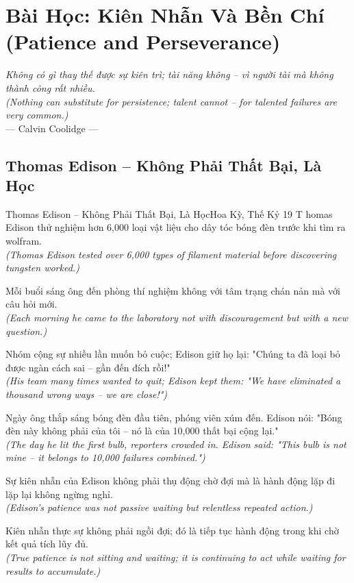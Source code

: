 \chapter{Bài Học: Kiên Nhẫn Và Bền Chí (Patience and Perseverance)}
\begin{center}
  \textit{\color{truyenblue}Không có gì thay thế được sự kiên trì; tài năng không -- vì người tài mà không thành công rất nhiều.}\\
  \textit{(Nothing can substitute for persistence; talent cannot -- for talented failures are very common.)}\\[4pt]
  \small\color{truyengold}--- Calvin Coolidge ---
\end{center}
\ngancach

\section{Thomas Edison -- Không Phải Thất Bại, Là Học}
\begin{truyen}{Thomas Edison -- Không Phải Thất Bại, Là Học}{Hoa Kỳ, Thế Kỷ 19}
T homas Edison thử nghiệm hơn 6,000 loại vật liệu cho dây tóc bóng đèn trước khi tìm ra wolfram.\\
\textit{(Thomas Edison tested over 6,000 types of filament material before discovering tungsten worked.)}

Mỗi buổi sáng ông đến phòng thí nghiệm không với tâm trạng chán nản mà với câu hỏi mới.\\
\textit{(Each morning he came to the laboratory not with discouragement but with a new question.)}

Nhóm cộng sự nhiều lần muốn bỏ cuộc; Edison giữ họ lại: "Chúng ta đã loại bỏ được ngàn cách sai -- gần đến đích rồi!"\\
\textit{(His team many times wanted to quit; Edison kept them: "We have eliminated a thousand wrong ways -- we are close!")}

Ngày ông thắp sáng bóng đèn đầu tiên, phóng viên xúm đến. Edison nói: "Bóng đèn này không phải của tôi -- nó là của 10,000 thất bại cộng lại."\\
\textit{(The day he lit the first bulb, reporters crowded in. Edison said: "This bulb is not mine -- it belongs to 10,000 failures combined.")}

Sự kiên nhẫn của Edison không phải thụ động chờ đợi mà là hành động lặp đi lặp lại không ngừng nghỉ.\\
\textit{(Edison's patience was not passive waiting but relentless repeated action.)}

\end{truyen}
\begin{baihoc}
  Kiên nhẫn thực sự không phải ngồi đợi; đó là tiếp tục hành động trong khi chờ kết quả tích lũy đủ.\\
  \textit{(True patience is not sitting and waiting; it is continuing to act while waiting for results to accumulate.)}
\end{baihoc}

